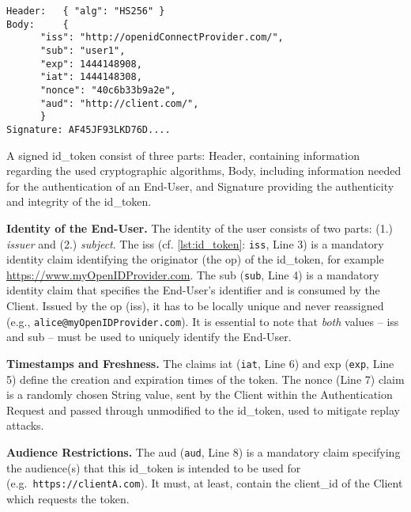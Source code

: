 \documentclass[conference,compsoc]{IEEEtran}
\renewcommand*{\paragraph}[1]{\vspace{2mm}\noindent\textbf{#1.}}
\begin{document}
\begin{lstlisting}[style=json,caption={An example of ID Token as JSON object.},label={lst:id_token}]
Header:   { "alg": "HS256" }
Body: 	  {
	  "iss": "http://openidConnectProvider.com/",
	  "sub": "user1",
	  "exp": 1444148908,
	  "iat": 1444148308,
	  "nonce": "40c6b33b9a2e",
	  "aud": "http://client.com/",
	  }
Signature: AF45JF93LKD76D....
\end{lstlisting}

A signed \gls{id_token} consist of three parts: Header, containing information regarding the used cryptographic algorithms, Body, including information needed for the authentication of an End-User, and Signature providing the authenticity and integrity of the \gls{id_token}.
 
\paragraph{Identity of the End-User}
The identity of the user consists of two parts: (1.) \emph{issuer} and (2.) \emph{subject}.
The \gls{iss} (cf. \autoref{lst:id_token}: \texttt{iss}, Line 3) is a mandatory identity claim identifying the originator (the \acrlong{op}) of the \gls{id_token}, for example \url{https://www.myOpenIDProvider.com}.
The \gls{sub} (\texttt{sub}, Line 4) is a mandatory identity claim that specifies the End-User's identifier and is consumed by the Client. 
Issued by the \acrlong{op} (\gls{iss}), it has to be locally unique and never reassigned (e.g., \texttt{alice@myOpenIDProvider.com}).
It is essential to note that \emph{both} values -- \gls{iss} and \gls{sub} -- must be used to uniquely identify the End-User.

\paragraph{Timestamps and Freshness}
The claims \gls{iat} (\texttt{iat}, Line 6) and \gls{exp} (\texttt{exp}, Line 5) define the creation and expiration times of the token.
The \gls{nonce} (Line 7) claim is a randomly chosen String value, sent by the Client within the Authentication Request and passed through unmodified to the \gls{id_token}, used to mitigate replay attacks.

\paragraph{Audience Restrictions}
The \gls{aud} (\texttt{aud}, Line 8) is a mandatory claim specifying the audience(s) that this \gls{id_token} is intended to be used for (e.g.\ \texttt{https://clientA.com}).
It must, at least, contain the \gls{client_id} of the Client which requests the token.
 
\end{document}
